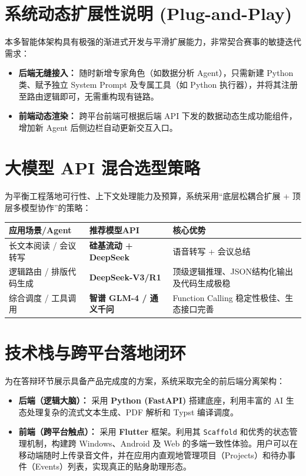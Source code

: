 \documentclass[12pt, a4paper]{ctexart}
\begin{document}
\section{系统动态扩展性说明 (Plug-and-Play)}
本多智能体架构具有极强的渐进式开发与平滑扩展能力，非常契合赛事的敏捷迭代需求：
\begin{itemize}
    \item \textbf{后端无缝接入：} 随时新增专家角色（如数据分析 Agent），只需新建 Python 类、赋予独立 System Prompt 及专属工具（如 Python 执行器），并将其注册至路由逻辑即可，无需重构现有链路。
    \item \textbf{前端动态渲染：} 跨平台前端可根据后端 API 下发的数据动态生成功能组件，增加新 Agent 后侧边栏自动更新交互入口。
\end{itemize}

\section{大模型 API 混合选型策略}
为平衡工程落地可行性、上下文处理能力及预算，系统采用“底层松耦合扩展 + 顶层多模型协作”的策略：

\begin{table}[h]
\centering
\begin{tabularx}{\textwidth}{@{}l l X@{}}
\toprule
\textbf{应用场景/Agent} & \textbf{推荐模型API} & \textbf{核心优势} \\ \midrule
长文本阅读 / 会议转写 & \textbf{硅基流动 + DeepSeek} & 语音转写 + 会议总结 \\
逻辑路由 / 排版代码生成 & \textbf{DeepSeek-V3/R1} & 顶级逻辑推理、JSON结构化输出及代码生成极稳 \\
综合调度 / 工具调用 & \textbf{智谱 GLM-4 / 通义千问} & Function Calling 稳定性极佳、生态接口完善 \\ \bottomrule
\end{tabularx}
\end{table}

\section{技术栈与跨平台落地闭环}
为在答辩环节展示具备产品完成度的方案，系统采取完全的前后端分离架构：
\begin{itemize}
    \item \textbf{后端（逻辑大脑）：} 采用 \textbf{Python (FastAPI)} 搭建底座，利用丰富的 AI 生态处理复杂的流式文本生成、PDF 解析和 Typst 编译调度。
    \item \textbf{前端（跨平台触点）：} 采用 \textbf{Flutter} 框架。利用其 \texttt{Scaffold} 和优秀的状态管理机制，构建跨 Windows、Android 及 Web 的多端一致性体验。用户可以在移动端随时上传录音文件，并在应用内直观地管理项目（Projects）和待办事件（Events）列表，实现真正的贴身助理形态。
\end{itemize}
\end{document}
